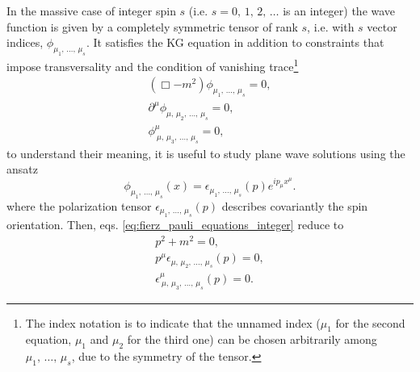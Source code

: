 In the massive case of integer spin \(s\) (i.e. \(s=0,\,1,\,2,\,\dots\) is an integer) the wave function is given by a completely symmetric tensor of rank \(s\), i.e. with \(s\) vector indices, \(\phi_{\mu_1,\,\dots,\,\mu_s}\). It satisfies the KG equation in addition to constraints that impose transversality and the condition of vanishing trace\footnote{The index notation is to indicate that the unnamed index (\(\mu_1\) for the second equation, \(\mu_1\) and \(\mu_2\) for the third one) can be chosen arbitrarily among \(\mu_1,\,\dots,\,\mu_s\), due to the symmetry of the tensor.}
\begin{equation}
    \begin{aligned}
        (\Box -m^2) \phi_{\mu_1,\,\dots,\,\mu_s} = 0,         \\
        \partial^{\mu}\phi_{\mu,\,\mu_2,\,\dots,\,\mu_s} = 0, \\
        \phi^{\mu}_{\ \mu,\,\mu_3,\,\dots,\,\mu_s} = 0,
    \end{aligned}
    \label{eq:fierz_pauli_equations_integer}
\end{equation}
to understand their meaning, it is useful to study plane wave solutions using the ansatz
\[
    \phi_{\mu_1,\,\dots,\,\mu_s}(x) = \epsilon_{\mu_1,\,\dots,\,\mu_s}(p) e^{i p_\mu x^{\mu}}.
\]
where the polarization tensor \(\epsilon_{\mu_1,\,\dots ,\,\mu_s}(p)\) describes covariantly the spin orientation. Then, eqs. \eqref{eq:fierz_pauli_equations_integer} reduce to
\[
    \begin{aligned}
        p^2 + m^2 = 0,                                         \\
        p^{\mu} \epsilon_{\mu,\,\mu_2,\,\dots,\,\mu_s}(p) = 0, \\
        \epsilon^{\mu}_{\ \mu,\,\mu_3,\,\dots,\,\mu_s}(p) = 0.
    \end{aligned}
\]
